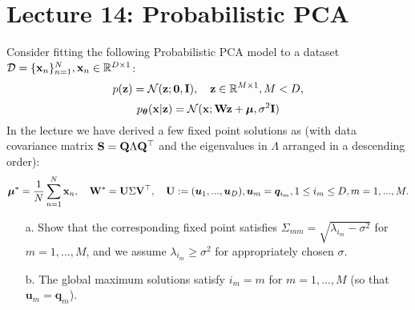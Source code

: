 \section{Lecture 14: Probabilistic PCA}

\begin{question}
\label{q:optimal_prob_pca}
Consider fitting the following Probabilistic PCA model to a dataset $\mathcal{D} = \{ \mathbf{x}_n \}_{n=1}^N, \mathbf{x}_n \in \mathbb{R}^{D \times 1}$:
$$p(\mathbf{z}) = \mathcal{N}(\mathbf{z}; \bm{0}, \mathbf{I}), \quad \mathbf{z} \in \mathbb{R}^{M \times 1}, M < D,$$
$$p_{\bm{\theta}}(\mathbf{x} | \mathbf{z}) = \mathcal{N}(\mathbf{x}; \mathbf W \mathbf{z} + \bm{\mu}, \sigma^2 \mathbf{I})$$
In the lecture we have derived a few fixed point solutions as (with data covariance matrix $\mathbf{S} = \mathbf{Q} \Lambda \mathbf{Q}^\top$ and the eigenvalues in $\Lambda$ arranged in a descending order):
$$\bm{\mu}^* = \frac{1}{N} \sum_{n=1}^N \mathbf{x}_n, \quad \mathbf W^* = \mathbf U \Sigma \mathbf V^{\top}, \quad \mathbf U := (\bm{u}_{1}, ..., \bm{u}_{D}),  \bm{u}_m = \bm{q}_{i_m}, 1 \leq i_m \leq D, m = 1, ..., M.$$
\begin{itemize}
\item[a.] Show that the corresponding fixed point satisfies $\Sigma_{mm} = \sqrt{\lambda_{i_m} - \sigma^2}$ for $m = 1, ..., M$, and we assume $\lambda_{i_m} \geq \sigma^2$ for appropriately chosen $\sigma$.
\item[b.] The global maximum solutions satisfy $i_m = m$ for $m = 1, ..., M$ (so that $\bm{u}_m = \bm{q}_m$).
\end{itemize}
\end{question}